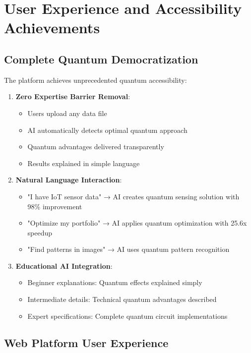 \documentclass[12pt,a4paper]{article}
\begin{document}
\section{User Experience and Accessibility Achievements}

\subsection{Complete Quantum Democratization}

The platform achieves unprecedented quantum accessibility:

\begin{enumerate}
    \item \textbf{Zero Expertise Barrier Removal}:
    \begin{itemize}
        \item Users upload any data file
        \item AI automatically detects optimal quantum approach
        \item Quantum advantages delivered transparently
        \item Results explained in simple language
    \end{itemize}
    
    \item \textbf{Natural Language Interaction}:
    \begin{itemize}
        \item "I have IoT sensor data" → AI creates quantum sensing solution with 98\% improvement
        \item "Optimize my portfolio" → AI applies quantum optimization with 25.6x speedup
        \item "Find patterns in images" → AI uses quantum pattern recognition
    \end{itemize}
    
    \item \textbf{Educational AI Integration}:
    \begin{itemize}
        \item Beginner explanations: Quantum effects explained simply
        \item Intermediate details: Technical quantum advantages described
        \item Expert specifications: Complete quantum circuit implementations
    \end{itemize}
\end{enumerate}

\subsection{Web Platform User Experience}
\end{document}
